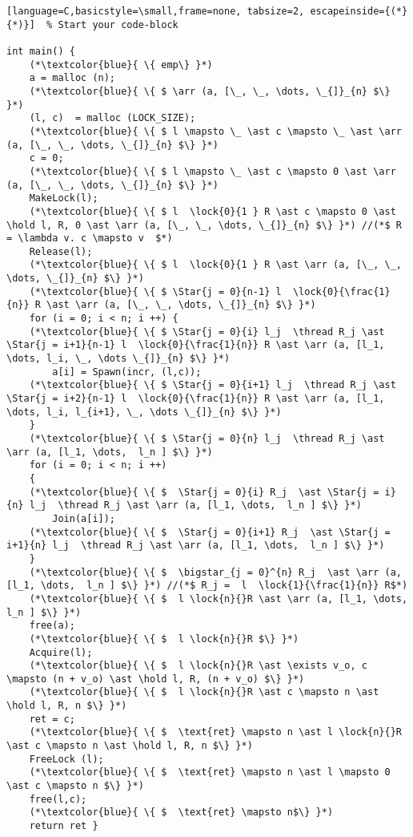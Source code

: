 \documentclass[8pt]{article}
\newcommand{\arr}{\text{array}}
\newcommand{\lock}[2]{ \square \hspace{-1ex} \xrightarrow[#1]{#2}}
\newcommand{\thread}{\ocircle \hspace{-1ex} \rightarrow}
\newcommand{\hold}{\text{Hold }}
\newcommand{\Star}[2]{ \underset{#1}{\overset{#2}{\bigstar}} }
\begin{document}
\begin{lstlisting}[language=C,basicstyle=\small,frame=none, tabsize=2, escapeinside={(*}{*)}]  % Start your code-block

int main() {
	(*\textcolor{blue}{ \{ emp\} }*)
	a = malloc (n);	
	(*\textcolor{blue}{ \{ $ \arr (a, [\_, \_, \dots, \_{]}_{n} $\} }*)
	(l, c)  = malloc (LOCK_SIZE);
	(*\textcolor{blue}{ \{ $ l \mapsto \_ \ast c \mapsto \_ \ast \arr (a, [\_, \_, \dots, \_{]}_{n} $\} }*)
	c = 0;
	(*\textcolor{blue}{ \{ $ l \mapsto \_ \ast c \mapsto 0 \ast \arr (a, [\_, \_, \dots, \_{]}_{n} $\} }*)
	MakeLock(l);
	(*\textcolor{blue}{ \{ $ l  \lock{0}{1 } R \ast c \mapsto 0 \ast \hold l, R, 0 \ast \arr (a, [\_, \_, \dots, \_{]}_{n} $\} }*) //(*$ R = \lambda v. c \mapsto v  $*)
	Release(l);
	(*\textcolor{blue}{ \{ $ l  \lock{0}{1 } R \ast \arr (a, [\_, \_, \dots, \_{]}_{n} $\} }*)
	(*\textcolor{blue}{ \{ $ \Star{j = 0}{n-1} l  \lock{0}{\frac{1}{n}} R \ast \arr (a, [\_, \_, \dots, \_{]}_{n} $\} }*)
	for (i = 0; i < n; i ++) {
	(*\textcolor{blue}{ \{ $ \Star{j = 0}{i} l_j  \thread R_j \ast \Star{j = i+1}{n-1} l  \lock{0}{\frac{1}{n}} R \ast \arr (a, [l_1, \dots, l_i, \_, \dots \_{]}_{n} $\} }*)
		a[i] = Spawn(incr, (l,c));
	(*\textcolor{blue}{ \{ $ \Star{j = 0}{i+1} l_j  \thread R_j \ast \Star{j = i+2}{n-1} l  \lock{0}{\frac{1}{n}} R \ast \arr (a, [l_1, \dots, l_i, l_{i+1}, \_, \dots \_{]}_{n} $\} }*)
	}
	(*\textcolor{blue}{ \{ $ \Star{j = 0}{n} l_j  \thread R_j \ast \arr (a, [l_1, \dots,  l_n ] $\} }*)
	for (i = 0; i < n; i ++)
	{
	(*\textcolor{blue}{ \{ $  \Star{j = 0}{i} R_j  \ast \Star{j = i}{n} l_j  \thread R_j \ast \arr (a, [l_1, \dots,  l_n ] $\} }*)
		Join(a[i]);
	(*\textcolor{blue}{ \{ $  \Star{j = 0}{i+1} R_j  \ast \Star{j = i+1}{n} l_j  \thread R_j \ast \arr (a, [l_1, \dots,  l_n ] $\} }*)
	}
	(*\textcolor{blue}{ \{ $  \bigstar_{j = 0}^{n} R_j  \ast \arr (a, [l_1, \dots,  l_n ] $\} }*) //(*$ R_j =  l  \lock{1}{\frac{1}{n}} R$*)
	(*\textcolor{blue}{ \{ $  l \lock{n}{}R \ast \arr (a, [l_1, \dots,  l_n ] $\} }*)
	free(a);
	(*\textcolor{blue}{ \{ $  l \lock{n}{}R $\} }*)
	Acquire(l);
	(*\textcolor{blue}{ \{ $  l \lock{n}{}R \ast \exists v_o, c \mapsto (n + v_o) \ast \hold l, R, (n + v_o) $\} }*)
	(*\textcolor{blue}{ \{ $  l \lock{n}{}R \ast c \mapsto n \ast \hold l, R, n $\} }*)
	ret = c;
	(*\textcolor{blue}{ \{ $  \text{ret} \mapsto n \ast l \lock{n}{}R \ast c \mapsto n \ast \hold l, R, n $\} }*)
	FreeLock (l);
	(*\textcolor{blue}{ \{ $  \text{ret} \mapsto n \ast l \mapsto 0 \ast c \mapsto n $\} }*)
	free(l,c);
	(*\textcolor{blue}{ \{ $  \text{ret} \mapsto n$\} }*)
	return ret }
\end{lstlisting}
\end{document}
